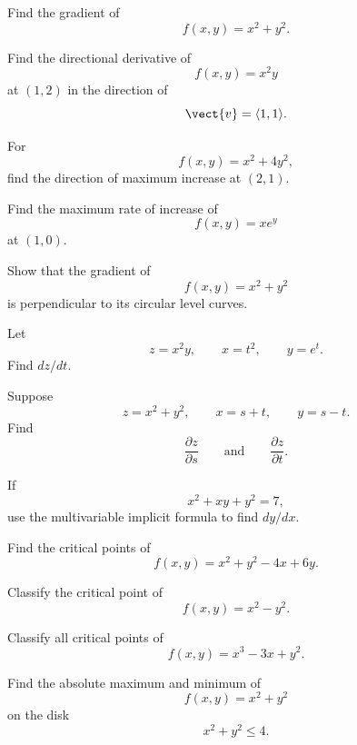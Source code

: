 \begin{exercise}[1]
Find the gradient of
\[ f(x,y)=x^2+y^2. \]
\end{exercise}

\begin{exercise}[2]
Find the directional derivative of
\[ f(x,y)=x^2y \]
at \((1,2)\) in the direction of
\[ \vect{v}=\langle1,1\rangle. \]
\end{exercise}

\begin{exercise}[2]
For
\[ f(x,y)=x^2+4y^2, \]
find the direction of maximum increase at \((2,1)\).
\end{exercise}

\begin{exercise}[2]
Find the maximum rate of increase of
\[ f(x,y)=xe^y \]
at \((1,0)\).
\end{exercise}

\begin{exercise}[2]
Show that the gradient of
\[ f(x,y)=x^2+y^2 \]
is perpendicular to its circular level curves.
\end{exercise}

\begin{exercise}[2]
Let
\[ z=x^2y,\qquad x=t^2,\qquad y=e^t. \]
Find \(dz/dt\).
\end{exercise}

\begin{exercise}[2]
Suppose
\[ z=x^2+y^2,\qquad x=s+t,\qquad y=s-t. \]
Find
\[ \frac{\partial z}{\partial s}
\qquad\text{and}\qquad
\frac{\partial z}{\partial t}. \]
\end{exercise}

\begin{exercise}[2]
If
\[ x^2+xy+y^2=7, \]
use the multivariable implicit formula to find \(dy/dx\).
\end{exercise}

\begin{exercise}[1]
Find the critical points of
\[ f(x,y)=x^2+y^2-4x+6y. \]
\end{exercise}

\begin{exercise}[2]
Classify the critical point of
\[ f(x,y)=x^2-y^2. \]
\end{exercise}

\begin{exercise}[2]
Classify all critical points of
\[ f(x,y)=x^3-3x+y^2. \]
\end{exercise}

\begin{exercise}[2]
Find the absolute maximum and minimum of
\[ f(x,y)=x^2+y^2 \]
on the disk
\[ x^2+y^2\leq4. \]
\end{exercise}

